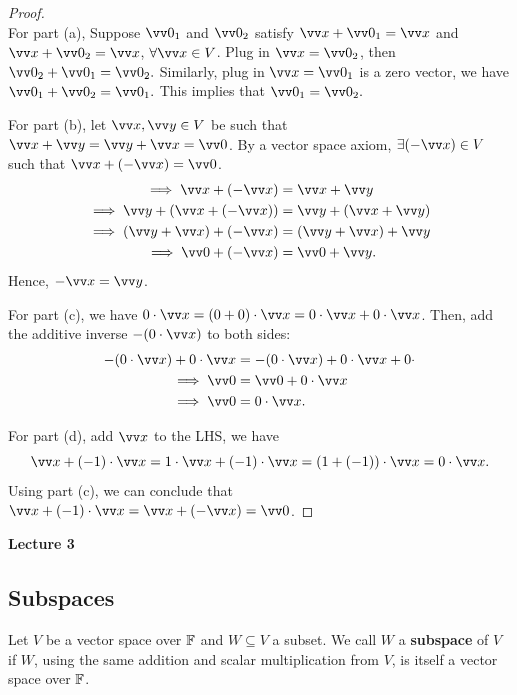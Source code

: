 \begin{proof}
    \phantom{}  \\
    For part (a), Suppose $\vzero_1$ and $\vzero_2$ satisfy $\vx + \vzero_1 = \vx$ and $\vx + \vzero_2 = \vx$, $\forall \vx \in V$.
    Plug in $\vx = \vzero_2$, then $\vzero_2 + \vzero_1 = \vzero_2.$
    Similarly, plug in $\vx = \vzero_1$ is a zero vector, we have $\vzero_1 + \vzero_2 = \vzero_1.$
    This implies that $\vzero_1 = \vzero_2.$

    For part (b), let $\vx, \vy \in V$ be such that $\vx + \vy = \vy + \vx = \vzero$. By a  vector space axiom, $\exists (-\vx) \in V$
    such that $\vx + (-\vx) = \vzero$.
    \begin{align*}
        \implies \vx + (-\vx) &= \vx + \vy  \\
        \implies \vy + (\vx + (-\vx)) &= \vy + (\vx + \vy)  \\
        \implies (\vy + \vx) + (-\vx) &= (\vy + \vx) + \vy    \\
        \implies \vzero + (-\vx) &= \vzero + \vy.
    \end{align*}
    Hence, $-\vx = \vy$.    \newpage

    For part (c), we have $0 \cdot \vx = (0 + 0) \cdot \vx = 0 \cdot \vx + 0 \cdot \vx$.
    Then, add the additive inverse $-(0 \cdot \vx)$ to both sides:
    \begin{align*}
        -(0 \cdot \vx) + 0 \cdot \vx &= -(0 \cdot \vx) + 0 \cdot \vx + 0 \cdot  \\
        \implies \vzero &= \vzero + 0 \cdot \vx \\
        \implies \vzero &= 0 \cdot \vx.
    \end{align*}

    For part (d), add $\vx$ to the LHS, we have
    \[\vx + (-1) \cdot \vx = 1 \cdot \vx + (-1) \cdot \vx = (1 + (-1)) \cdot \vx = 0 \cdot \vx.\]
    Using part (c), we can conclude that $\vx + (-1) \cdot \vx = \vx + (-\vx) = \vzero$.
\end{proof}

\makebox[\linewidth]{\hrulefill}
{\large \textbf{Lecture 3}}


\subsection{Subspaces}

\begin{definition}
    Let $V$ be a vector space over ${\mathbb{F}}$ and $W \subseteq V$ a subset. We call $W$ a
    \textbf{subspace} of $V$ if $W$, using the same addition and scalar multiplication from $V$,
    is itself a vector space over ${\mathbb{F}}$.    
\end{definition}

